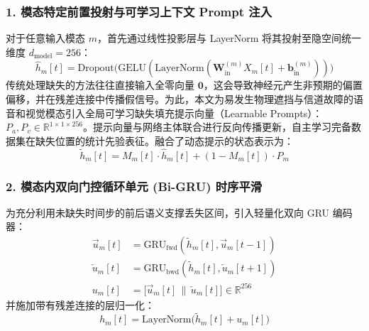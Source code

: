 \subsubsection{1. 模态特定前置投射与可学习上下文 Prompt 注入}
对于任意输入模态 $m$，首先通过线性投影层与 LayerNorm 将其投射至隐空间统一维度 $d_{\text{model}} = 256$：
\begin{equation}
\hat{h}_m[t] = \text{Dropout}\big(\text{GELU}(\text{LayerNorm}(\mathbf{W}_{\text{in}}^{(m)} X_m[t] + \mathbf{b}_{\text{in}}^{(m)}))\big)
\end{equation}
传统处理缺失的方法往往直接输入全零向量 $\mathbf{0}$，这会导致神经元产生非预期的偏置偏移，并在残差连接中传播假信号。为此，本文为易发生物理遮挡与信道故障的语音和视觉模态引入全局可学习缺失填充提示向量（Learnable Prompts）：$P_a, P_v \in \mathbb{R}^{1 \times 1 \times 256}$。提示向量与网络主体联合进行反向传播更新，自主学习完备数据集在缺失位置的统计先验表征。融合了动态提示的状态表示为：
\begin{equation}
\tilde{h}_m[t] = M_m[t] \cdot \hat{h}_m[t] + (1 - M_m[t]) \cdot P_m
\end{equation}

\subsubsection{2. 模态内双向门控循环单元 (Bi-GRU) 时序平滑}
为充分利用未缺失时间步的前后语义支撑丢失区间，引入轻量化双向 GRU 编码器：
\begin{align}
\overrightarrow{u}_m[t] &= \text{GRU}_{\text{fwd}}(\tilde{h}_m[t], \overrightarrow{u}_m[t-1]) \\
\overleftarrow{u}_m[t] &= \text{GRU}_{\text{bwd}}(\tilde{h}_m[t], \overleftarrow{u}_m[t+1]) \\
u_m[t] &= \big[ \overrightarrow{u}_m[t] \,\|\, \overleftarrow{u}_m[t] \big] \in \mathbb{R}^{256}
\end{align}
并施加带有残差连接的层归一化：
\begin{equation}
h_m[t] = \text{LayerNorm}\big(\tilde{h}_m[t] + u_m[t]\big)
\end{equation}

